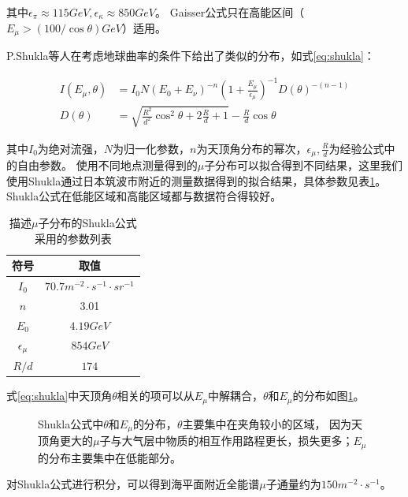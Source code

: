 其中$\epsilon_\pi\approx115\si{GeV},\epsilon_\kappa\approx850\si{GeV}$。
Gaisser公式只在高能区间（$E_\mu>(100/\cos\theta)\si{GeV}$）适用。

P.Shukla等人在考虑地球曲率的条件下给出了类似的分布\cite{shukla_energy_2018}，如式\ref{eq:shukla}：

\begin{align}
    \label{eq:shukla}
    I\left(E_\mu,\theta\right) &= I_0 N\left(E_0+E_\nu\right)^{-n}\left(1 + \frac{E_\mu}{\epsilon_\mu}\right)^{-1}D(\theta)^{-(n-1)} \\
    D(\theta) &= \sqrt{\frac{R^2}{d^2}\cos^2\theta+2\frac{R}{d}+1}-\frac{R}{d}\cos\theta
\end{align}

其中$I_0$为绝对流强，$N$为归一化参数，$n$为天顶角分布的幂次，$\epsilon_\mu,\frac{R}{d}$为经验公式中的自由参数。
使用不同地点测量得到的$\mu$子分布可以拟合得到不同结果，这里我们使用Shukla通过日本筑波市附近的测量数据得到的拟合结果，具体参数见表\ref{tab:shukla}。
Shukla公式在低能区域和高能区域都与数据符合得较好。

\begin{table}
  \centering
  \caption{描述$\mu$子分布的Shukla公式采用的参数列表}
  \begin{tabular}{cc}
    \toprule
    符号 & 取值 \\
    \midrule
    $I_0$ & $70.7\si{m^{-2}\cdot s^{-1}\cdot sr^{-1}}$ \\
    $n$ & 3.01 \\
    $E_0$ & $4.19\si{GeV}$ \\
    $\epsilon_\mu$ & $854\si{GeV}$ \\
    $R/d$ & $174$ \\
    \bottomrule
  \end{tabular}
  \label{tab:shukla}
\end{table}

式\ref{eq:shukla}中天顶角$\theta$相关的项可以从$E_\mu$中解耦合，$\theta$和$E_\mu$的分布如图\ref{fig:shukla_distribution}。

\begin{figure}
    \centering
    
    \caption{\label{fig:shukla_distribution} Shukla公式中$\theta$和$E_\mu$的分布，$\theta$主要集中在夹角较小的区域，
    因为天顶角更大的$\mu$子与大气层中物质的相互作用路程更长，损失更多；$E_\mu$的分布主要集中在低能部分。}
\end{figure}

对Shukla公式进行积分，可以得到海平面附近全能谱$\mu$子通量约为$150\si{m^{-2}\cdot s^{-1}}$。

